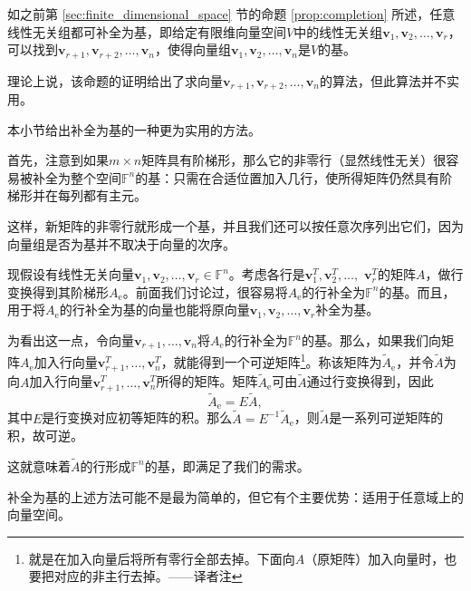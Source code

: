 如之前第 \ref{sec:finite_dimensional_space} 节的命题 \ref{prop:completion} 所述，任意线性无关组都可补全为基，即给定有限维向量空间$V$中的线性无关组$\mathbf{v}_1,\mathbf{v}_2,\ldots,\mathbf{v}_r$，可以找到$\mathbf{v}_{r+1},\mathbf{v}_{r+2},\ldots,\mathbf{v}_{n}$，使得向量组$\mathbf{v}_1,\mathbf{v}_2,\ldots,\mathbf{v}_n$是$V$的基。

理论上说，该命题的证明给出了求向量$\mathbf{v}_{r+1},\mathbf{v}_{r+2},\ldots,\mathbf{v}_{n}$的算法，但此算法并不实用。

本小节给出补全为基的一种更为实用的方法。

首先，注意到如果$m\times n$矩阵具有阶梯形，那么它的非零行（显然线性无关）很容易被补全为整个空间$\mathbb{F}^n$的基：只需在合适位置加入几行，使所得矩阵仍然具有阶梯形并在每列都有主元。

这样，新矩阵的非零行就形成一个基，并且我们还可以按任意次序列出它们，因为向量组是否为基并不取决于向量的次序。

现假设有线性无关向量$\mathbf{v}_1,\mathbf{v}_2,\ldots,\mathbf{v}_r\in\mathbb{F}^n$。考虑各行是$\mathbf{v}_{1}^{T},\mathbf{v}_{2}^{T},\ldots,$ $\mathbf{v}_{r}^{T}$的矩阵$A$，做行变换得到其阶梯形$A_\mathrm{e}$。前面我们讨论过，很容易将$A_\mathrm{e}$的行补全为$\mathbb{F}^n$的基。而且，用于将$A_\mathrm{e}$的行补全为基的向量也能将原向量$\mathbf{v}_1,\mathbf{v}_2,\ldots,\mathbf{v}_r$补全为基。

为看出这一点，令向量$\mathbf{v}_{r+1},\ldots,\mathbf{v}_{n}$将$A_\mathrm{e}$的行补全为$\mathbb{F}^n$的基。那么，如果我们向矩阵$A_\mathrm{e}$加入行向量$\mathbf{v}_{r+1}^{T},\ldots,\mathbf{v}_{n}^{T}$，就能得到一个可逆矩阵\footnote{就是在加入向量后将所有零行全部去掉。下面向$A$（原矩阵）加入向量时，也要把对应的非主行去掉。——译者注}。称该矩阵为$\widetilde{A}_{\mathrm{e}}$，并令$\widetilde{A}$为向$A$加入行向量$\mathbf{v}_{r+1}^{T},\ldots,\mathbf{v}_{n}^{T}$所得的矩阵。矩阵$\widetilde{A}_{\mathrm{e}}$可由$\widetilde{A}$通过行变换得到，因此\[\widetilde{A}_{\mathrm{e}} = E\widetilde{A},\]其中$E$是行变换对应初等矩阵的积。那么$\widetilde{A}=E^{-1}\widetilde{A}_{\mathrm{e}}$，则$\widetilde{A}$是一系列可逆矩阵的积，故可逆。

这就意味着$\widetilde{A}$的行形成$\mathbb{F}^n$的基，即满足了我们的需求。

\begin{remark*}
  补全为基的上述方法可能不是最为简单的，但它有个主要优势：适用于任意域上的向量空间。
\end{remark*}

